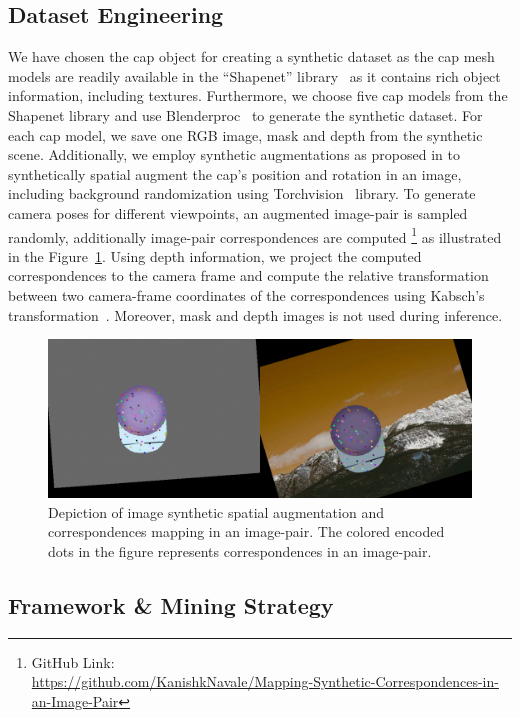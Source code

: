 \subsection{Dataset Engineering}

We have chosen the cap object for creating a synthetic dataset as the cap mesh models are readily available in the ``Shapenet''
library~\cite{chang2015shapenet} as it contains rich object information, including textures.
Furthermore, we choose five cap models from the Shapenet library and use Blenderproc~\cite{blenderproc}
to generate the synthetic dataset. For each cap model, we save one RGB image, mask and depth from the synthetic scene.
Additionally, we employ synthetic augmentations as proposed in \cite{adrian2022efficient} to synthetically
spatial augment the cap's position and rotation in an image, including background randomization
using Torchvision~\cite{marcel2010torchvision} library. To generate camera poses for different viewpoints,
an augmented image-pair is sampled randomly, additionally image-pair correspondences are computed
\footnote[1]{GitHub Link: \\ \url{https://github.com/KanishkNavale/Mapping-Synthetic-Correspondences-in-an-Image-Pair}}
as illustrated in the Figure~\ref{fig:image_augs}. Using depth information,
we project the computed correspondences to the camera frame and compute the relative transformation between
two camera-frame coordinates of the correspondences using Kabsch's transformation~\cite{kabsch}.
Moreover, mask and depth images is not used during inference.

\begin{figure}[htb]
    \centering
    \includegraphics[scale=0.2]{images/debug_correspondences.png}
    \caption{Depiction of image synthetic spatial augmentation and correspondences mapping in an image-pair. The colored encoded dots in the figure represents correspondences in an image-pair.}
    \label{fig:image_augs}
\end{figure}

\subsection{Framework \& Mining Strategy}

